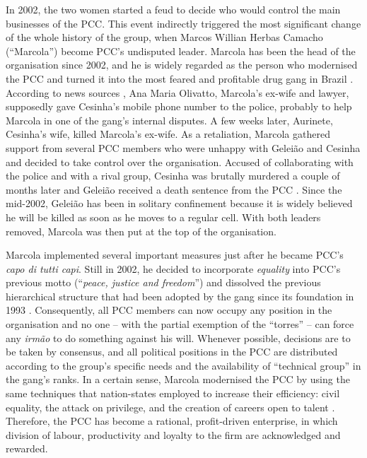 In 2002, the two women started a feud to decide who would control the main businesses of the PCC. This event indirectly triggered the most significant change of the whole history of the group, when Marcos Willian Herbas Camacho (``Marcola'') become PCC's undisputed leader. Marcola has been the head of the organisation since 2002, and he is widely regarded as the person who modernised the PCC and turned it into the most feared and profitable drug gang in Brazil \citep[]{insight2012pcc}. According to news sources \citep{istoe2013marcola}, Ana Maria Olivatto, Marcola's ex-wife and lawyer, supposedly gave Cesinha's mobile phone number to the police, probably to help Marcola in one of the gang's internal disputes. A few weeks later, Aurinete, Cesinha's wife, killed Marcola's ex-wife. As a retaliation, Marcola gathered support from several PCC members who were unhappy with Gelei\~{a}o and Cesinha and decided to take control over the organisation. Accused of collaborating with the police and with a rival group, Cesinha was brutally murdered a couple of months later \citep[]{folha2006cesinha} and Gelei\~{a}o received a death sentence from the PCC \citep[]{congressoemfoco2006marcola}. Since the mid-2002, Gelei\~{a}o has been in solitary confinement because it is widely believed he will be killed as soon as he moves to a regular cell. With both leaders removed, Marcola was then put at the top of the organisation.

Marcola implemented several important measures just after he became PCC's \textit{capo di tutti capi}. Still in 2002, he decided to incorporate \textit{equality} into PCC's previous motto (``\textit{peace, justice and freedom}'') and dissolved the previous hierarchical structure that had been adopted by the gang since its foundation in 1993 \citep{biondi2010junto}. Consequently, all PCC members can now occupy any position in the organisation and no one -- with the partial exemption of the ``torres'' -- can force any \textit{irm\~{a}o} to do something against his will. Whenever possible, decisions are to be taken by consensus, and all political positions in the PCC are distributed according to the group's specific needs and the availability of ``technical group'' in the gang's ranks. In a certain sense, Marcola modernised the PCC by using the same techniques that nation-states employed to increase their efficiency: civil equality, the attack on privilege, and the creation of careers open to talent \citep[]{hobsbawm2010age}. Therefore, the PCC has become a rational, profit-driven enterprise, in which division of labour, productivity and loyalty to the firm are acknowledged and rewarded. 

